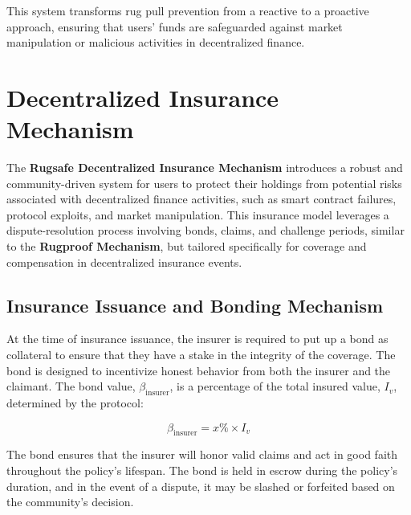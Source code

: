 \documentclass{article}
\begin{document}
This system transforms rug pull prevention from a reactive to a proactive approach, ensuring that users' funds are safeguarded against market manipulation or malicious activities in decentralized finance.











 




\section{Decentralized Insurance Mechanism}

The \textbf{Rugsafe Decentralized Insurance Mechanism} introduces a robust and community-driven system for users to protect their holdings from potential risks associated with decentralized finance activities, such as smart contract failures, protocol exploits, and market manipulation. This insurance model leverages a dispute-resolution process involving bonds, claims, and challenge periods, similar to the \textbf{Rugproof Mechanism}, but tailored specifically for coverage and compensation in decentralized insurance events.

\subsection{Insurance Issuance and Bonding Mechanism}

At the time of insurance issuance, the insurer is required to put up a bond as collateral to ensure that they have a stake in the integrity of the coverage. The bond is designed to incentivize honest behavior from both the insurer and the claimant. The bond value, $\beta_{\text{insurer}}$, is a percentage of the total insured value, $I_v$, determined by the protocol:

\[
\beta_{\text{insurer}} = x\% \times I_v
\]

The bond ensures that the insurer will honor valid claims and act in good faith throughout the policy's lifespan. The bond is held in escrow during the policy's duration, and in the event of a dispute, it may be slashed or forfeited based on the community’s decision.
\end{document}

